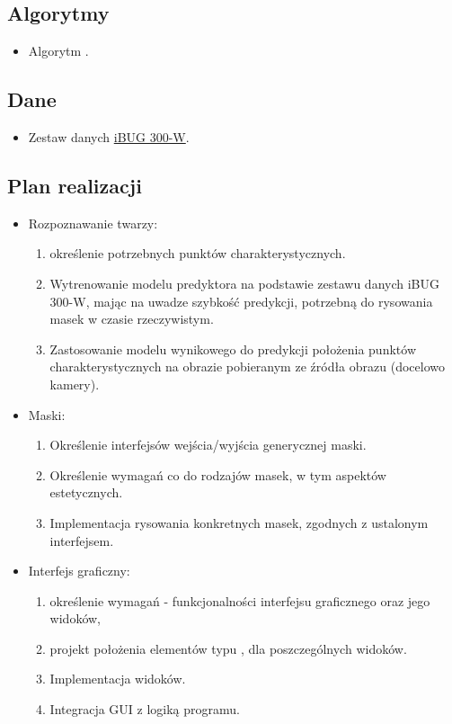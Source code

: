 \subsection{Algorytmy}
\begin{itemize}
    \item Algorytm \href{http://www.csc.kth.se/~vahidk/face_ert.html}{}\cite{face-ert}.
\end{itemize}

\subsection{Dane}
\begin{itemize}
\item Zestaw danych \href{https://ibug.doc.ic.ac.uk/resources/300-W/}{iBUG 300-W}\cite{300-w}. 
\end{itemize}


\subsection{Plan realizacji}
\begin{itemize}

    \item Rozpoznawanie twarzy: 
    \begin{enumerate}
        \item określenie potrzebnych punktów charakterystycznych.
        \item Wytrenowanie modelu predyktora na podstawie zestawu danych iBUG 300-W\cite{300-w}, mając na uwadze szybkość predykcji, potrzebną do rysowania masek w czasie rzeczywistym. 
        \item Zastosowanie modelu wynikowego do predykcji położenia punktów charakterystycznych na obrazie pobieranym ze źródła obrazu (docelowo kamery).
    \end{enumerate}
  
    \item Maski:
    \begin{enumerate}
        \item Określenie interfejsów wejścia/wyjścia generycznej maski.
        \item Określenie wymagań co do rodzajów masek, w tym aspektów estetycznych.
        \item Implementacja rysowania konkretnych masek, zgodnych z ustalonym interfejsem.
    \end{enumerate}
  
    \item Interfejs graficzny:
    \begin{enumerate}
        \item określenie wymagań - funkcjonalności interfejsu graficznego oraz jego widoków,
        \item projekt położenia elementów typu , dla poszczególnych widoków.
        \item Implementacja widoków.
        \item Integracja GUI z logiką programu.
    \end{enumerate}

\end{itemize} 
